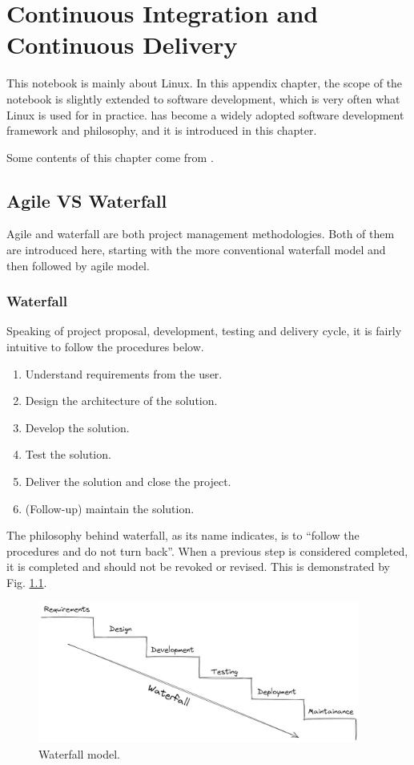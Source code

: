 \chapter{Continuous Integration and Continuous Delivery} \label{ch:cicd}

This notebook is mainly about Linux. In this appendix chapter, the scope of the notebook is slightly extended to software development, which is very often what Linux is used for in practice.  has become a widely adopted software development framework and philosophy, and it is introduced in this chapter.

Some contents of this chapter come from \cite{honai2023cicd}.

\section{Agile VS Waterfall}

Agile and waterfall are both project management methodologies. Both of them are introduced here, starting with the more conventional waterfall model and then followed by agile model.

\subsection{Waterfall}

Speaking of project proposal, development, testing and delivery cycle, it is fairly intuitive to follow the procedures below.
\begin{enumerate}
	\item Understand requirements from the user.
	\item Design the architecture of the solution.
	\item Develop the solution.
	\item Test the solution.
	\item Deliver the solution and close the project.
	\item (Follow-up) maintain the solution.
\end{enumerate}
The philosophy behind waterfall, as its name indicates, is to ``follow the procedures and do not turn back''. When a previous step is considered completed, it is completed and should not be revoked or revised. This is demonstrated by Fig. \ref{ch:cicd:fig:waterfall}.
\begin{figure}[htbp]
	\centering
	\includegraphics[width=300pt]{chapters/ap/figures/waterfall.png}
	\caption{Waterfall model.} \label{ch:cicd:fig:waterfall}
\end{figure}

